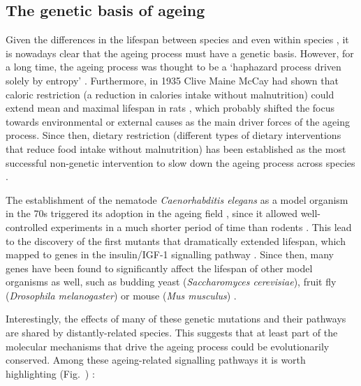 \smallskip

\subsection{The genetic basis of ageing} \label{s:1.1.2}

\smallskip

Given the differences in the lifespan between species and even within species \cite{Jones2013, Gems2000}, it is nowadays clear that the ageing process must have a genetic basis. However, for a long time, the ageing process was thought to be a `haphazard process driven solely by entropy' \cite{Kenyon2005}. Furthermore, in 1935 Clive Maine McCay had shown that caloric restriction (a reduction in calories intake without malnutrition) could extend mean and maximal lifespan in rats \cite{McCay1935,McDonald2010}, which probably shifted the focus towards environmental or external causes as the main driver forces of the ageing process. Since then, dietary restriction (different types of dietary interventions that reduce food intake without malnutrition) has been established as the most successful non-genetic intervention to slow down the ageing process across species \cite{Fontana2015}.

\bigskip

The establishment of the nematode \textit{Caenorhabditis elegans} as a model organism in the 70s triggered its adoption in the ageing field \cite{KLASS1976}, since it allowed well-controlled experiments in a much shorter period of time than rodents \cite{Johnson2013}. This lead to the discovery of the first mutants that dramatically extended lifespan, which mapped to genes in the insulin/IGF-1 signalling pathway \cite{Kenyon1993,Morris1996}. Since then, many genes have been found to significantly affect the lifespan of other model organisms as well, such as budding yeast (\textit{Saccharomyces cerevisiae}), fruit fly (\textit{Drosophila melanogaster}) or mouse (\textit{Mus musculus}) \cite{Kenyon2005,Kenyon2010,Singh2019}. 

\bigskip

Interestingly, the effects of many of these genetic mutations and their pathways are shared by distantly-related species. This suggests that at least part of the molecular mechanisms that drive the ageing process could be evolutionarily conserved. Among these ageing-related signalling pathways it is worth highlighting (Fig.~) \cite{Kenyon2005,Kenyon2010,Singh2019,Greer2008}:

